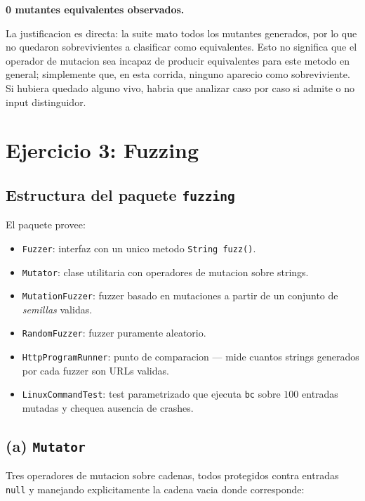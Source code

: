 \documentclass[12pt,a4paper]{article}
\begin{document}
\textbf{0 mutantes equivalentes observados.}

La justificacion es directa: la suite mato todos los mutantes generados, por lo que no quedaron
sobrevivientes a clasificar como equivalentes. Esto no significa que el operador de mutacion
sea incapaz de producir equivalentes para este metodo en general; simplemente que, en esta
corrida, ninguno aparecio como sobreviviente. Si hubiera quedado alguno vivo, habria que
analizar caso por caso si admite o no input distinguidor.

\section{Ejercicio 3: Fuzzing}

\subsection{Estructura del paquete \texttt{fuzzing}}

El paquete provee:

\begin{itemize}
  \item \texttt{Fuzzer}: interfaz con un unico metodo \texttt{String fuzz()}.
  \item \texttt{Mutator}: clase utilitaria con operadores de mutacion sobre strings.
  \item \texttt{MutationFuzzer}: fuzzer basado en mutaciones a partir de un conjunto de
  \emph{semillas} validas.
  \item \texttt{RandomFuzzer}: fuzzer puramente aleatorio.
  \item \texttt{HttpProgramRunner}: punto de comparacion --- mide cuantos strings generados por
  cada fuzzer son URLs validas.
  \item \texttt{LinuxCommandTest}: test parametrizado que ejecuta \texttt{bc} sobre $100$
  entradas mutadas y chequea ausencia de crashes.
\end{itemize}

\subsection{(a) \texttt{Mutator}}

Tres operadores de mutacion sobre cadenas, todos protegidos contra entradas \texttt{null} y
manejando explicitamente la cadena vacia donde corresponde:
\end{document}
